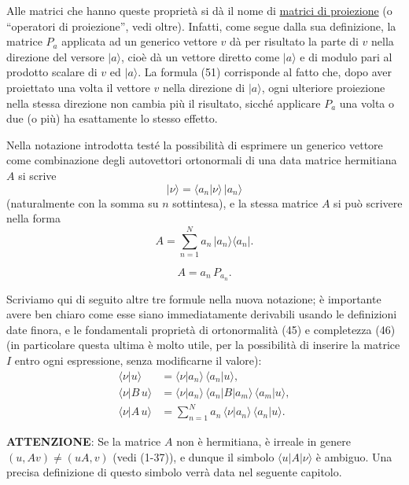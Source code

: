 \documentclass[11pt, a4paper]{book}
\numberwithin{equation}{section}
\begin{document}
Alle matrici che hanno queste proprietà si dà il nome di \underline{matrici
di proiezione} (o ``operatori di proiezione'', vedi oltre). Infatti, come
segue dalla sua definizione, la matrice $P_a$ applicata ad un generico
vettore $v$ dà per risultato la parte di $v$ nella direzione del versore
$|a\rangle$, cioè dà un vettore diretto come $|a\rangle$ e di modulo pari
al prodotto scalare di $v$ ed $|a\rangle$. La formula (51) corrisponde al
fatto che, dopo aver proiettato una volta il vettore $v$ nella direzione di
$|a\rangle$, ogni ulteriore proiezione nella stessa direzione non cambia più
il risultato, sicché applicare $P_a$ una volta o due (o più) ha esattamente
lo stesso effetto.

Nella notazione introdotta testé la possibilità di esprimere un generico
vettore come combinazione degli autovettori ortonormali di una data matrice
hermitiana $A$ si scrive
\begin{equation}
|\nu\rangle = \langle a_n|\nu\rangle\,|a_n\rangle
\end{equation}
(naturalmente con la somma su $n$ sottintesa), e la stessa matrice $A$ si
può scrivere nella forma
\begin{equation}
A = \sum_{n=1}^{N} a_n\,|a_n\rangle\langle a_n|. \tag{53a}
\end{equation}


\begin{equation}
A = a_n\,P_{a_n}. \tag{53b}
\end{equation}

Scriviamo qui di seguito altre tre formule nella nuova notazione; è
importante avere ben chiaro come esse siano immediatamente derivabili
usando le definizioni date finora, e le fondamentali proprietà di
ortonormalità (45) e completezza (46) (in particolare questa ultima è molto
utile, per la possibilità di inserire la matrice $I$ entro ogni
espressione, senza modificarne il valore):
\begin{align*}
\langle \nu | u \rangle
  &= \langle \nu | a_n \rangle\,\langle a_n | u \rangle, \\
\langle \nu | B\, u \rangle
  &= \langle \nu | a_n \rangle\,\langle a_n | B | a_m \rangle\,
     \langle a_m | u \rangle, \\
\langle \nu | A\, u \rangle
  &= \sum_{n=1}^{N} a_n\,\langle \nu | a_n \rangle\,\langle a_n | u \rangle.
\end{align*}

\textbf{ATTENZIONE}: Se la matrice $A$ non è hermitiana, è irreale in
genere $(u, Av) \neq (uA, v)$ (vedi (1-37)), e dunque il simbolo
$\langle u | A | \nu \rangle$ è ambiguo. Una precisa definizione di questo
simbolo verrà data nel seguente capitolo.
\end{document}

